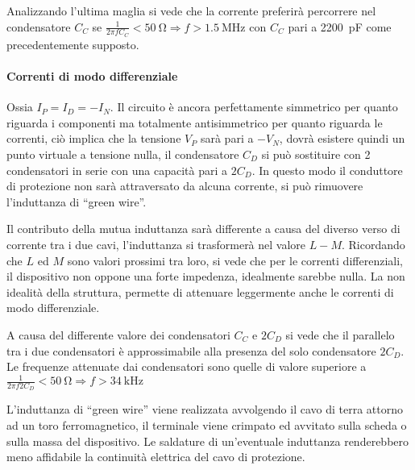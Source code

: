 Analizzando l'ultima maglia si vede che la corrente preferirà percorrere nel 
condensatore $C_C$ se $\frac{1}{2 \pi f C_C} < \SI{50}{\ohm} 
\Rightarrow f > \SI{1.5}{\mega\hertz}$ con $C_C$ pari a \SI{2200}{\pico\farad} come 
precedentemente supposto.

\paragraph{Correnti di modo differenziale} Ossia $I_P = I_D = - I_N$.
Il circuito è ancora perfettamente simmetrico per quanto riguarda i componenti
ma totalmente antisimmetrico per quanto riguarda le correnti, ciò implica che 
la tensione $V_P$ sarà pari a $-V_N$, dovrà esistere quindi un punto virtuale a tensione
nulla, il condensatore $C_D$ si può sostituire con 2 condensatori in serie
con una capacità pari a $2C_D$.
In questo modo il conduttore di protezione non sarà attraversato da alcuna corrente, si 
può rimuovere l'induttanza di ``green wire''.

Il contributo della mutua induttanza sarà differente a causa del diverso verso di corrente
tra i due cavi, l'induttanza si trasformerà nel valore $L-M$.
Ricordando che $L$ ed $M$ sono valori prossimi tra loro, si vede che per le correnti
differenziali, il dispositivo non oppone una forte impedenza, idealmente sarebbe nulla.
La non idealità della struttura, permette di attenuare leggermente anche le correnti
di modo differenziale.

A causa del differente valore dei condensatori $C_C$ e $2C_D$ si vede che il parallelo
tra i due condensatori è approssimabile alla presenza del solo condensatore $2C_D$.
Le frequenze attenuate dai condensatori sono quelle di valore superiore a
$\frac{1}{2 \pi f 2C_D}< \SI{50}{\ohm} \Rightarrow f > \SI{34}{\kilo\hertz} $

L'induttanza di ``green wire'' viene realizzata avvolgendo il cavo di terra attorno
ad un toro ferromagnetico, il terminale viene crimpato ed avvitato sulla scheda
o sulla massa del dispositivo. Le saldature di un'eventuale induttanza renderebbero
meno affidabile la continuità elettrica del cavo di protezione.
